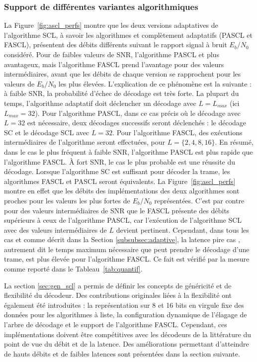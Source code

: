 \subsubsection{Support de différentes variantes algorithmiques}
La Figure~\ref{fig:ascl_perfs} montre que les deux versions adaptatives de l'algorithme SCL, à savoir les algorithmes et complètement adaptatifs (PASCL et FASCL), présentent des débits différents suivant le rapport signal à bruit $E_b/N_0$ considéré. Pour de faibles valeurs de SNR, l'algorithme PASCL et plus avantageux, mais l'algorithme FASCL prend l'avantage pour des valeurs intermédiaires, avant que les débits de chaque version se rapprochent pour les valeurs de $E_b/N_0$ les plus élevées.
L'explication de ce phénomène est la suivante : à faible SNR, la probabilité d'échec de décodage est très forte. La plupart du temps, l'algorithme adaptatif doit déclencher un décodage avec $L=L_{max}$ (ici $L_{max}=32$). Pour l'algorithme PASCL, dans ce cas précis où le décodage avec $L=32$ est nécessaire, deux décodages successifs seront déclenchés : le décodage SC et le décodage SCL avec $L=32$. Pour l'algorithme FASCL, des exécutions intermédiaires de l'algorithme seront effectuées, pour $L=\{2,4,8,16\}$. En résumé, dans le cas le plus fréquent à faible SNR, l'algorithme PASCL est plus rapide que l'algorithme FASCL.
\`A fort SNR, le cas le plus probable est une réussite du décodage. Lorsque l'algorithme SC est suffisant pour décoder la trame, les algorithmes FASCL et PASCL seront équivalents. La Figure~\ref{fig:ascl_perfs} montre en effet que les débits des implémentations des deux algorithmes sont proches pour les valeurs les plus fortes de $E_b/N_0$ représentées. C'est par contre pour des valeurs intermédiaires de SNR que le FASCL présente des débits supérieurs à ceux de l'algorithme PASCL, car l'exécution de l'algorithme SCL avec des valeurs intermédiaires de $L$ devient pertinent. Cependant, dans tous les cas et comme décrit dans la Section \ref{subsubsec:adaptive}, la latence \og pire cas \fg, autrement dit le temps maximum nécessaire que peut prendre le décodage d'une trame, est plus élevée pour l'algorithme FASCL. Ce fait est vérifié par la mesure comme reporté dans le Tableau~\ref{tab:quantif}.

La section \ref{sec:gen_scl} a permis de définir les concepts de généricité et de flexibilité du décodeur. Des contributions originales liées à la flexibilité ont également été introduites : la représentation sur 8 et 16 bits en virgule fixe des données pour les algorithmes à liste, la configuration dynamique de l'élagage de l'arbre de décodage et le support de l'algorithme FASCL. Cependant, ces implémentations doivent être compétitives avec les décodeurs de la littérature du point de vue du débit et de la latence. Des améliorations permettant d'atteindre de hauts débits et de faibles latences sont présentées dans la section suivante.

